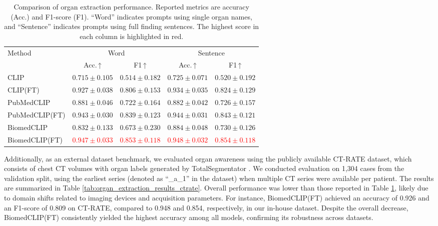\documentclass[bioengineering,article,submit,pdftex,moreauthors]{Definitions/mdpi}
\begin{document}
\begin{table}[ht]
  \centering
  \caption{Comparison of organ extraction performance. Reported metrics are accuracy (Acc.) and F1-score (F1). 
  “Word” indicates prompts using single organ names, and “Sentence” indicates prompts using full finding sentences. 
  The highest score in each column is highlighted in red.}
  \label{tab:organ_extraction_results}
  \begin{tabular}{lcccc}
    \toprule
    \multirow{2}{*}{Method} & \multicolumn{2}{c}{Word}               & \multicolumn{2}{c}{Sentence}           \\
    \cmidrule(lr){2-3}\cmidrule(lr){4-5}
                           & Acc.\,↑ & F1\,↑         & Acc.\,↑   & F1\,↑         \\ 
    \midrule
    CLIP                    & $0.715\pm0.105$ & $0.514\pm0.182$ & $0.725\pm0.071$ & $0.520\pm0.192$ \\
    CLIP(FT)                & $0.927\pm0.038$ & $0.806\pm0.153$ & $0.934\pm0.035$ & $0.824\pm0.129$ \\
    PubMedCLIP              & $0.881\pm0.046$ & $0.722\pm0.164$ & $0.882\pm0.042$ & $0.726\pm0.157$ \\
    PubMedCLIP(FT)          & $0.943\pm0.030$ & $0.839\pm0.123$ & $0.944\pm0.031$ & $0.843\pm0.121$ \\
    BiomedCLIP              & $0.832\pm0.133$ & $0.673\pm0.230$ & $0.884\pm0.048$ & $0.730\pm0.126$ \\
    BiomedCLIP(FT)          & \textcolor{red}{$0.947\pm0.033$} & \textcolor{red}{$0.853\pm0.118$} & \textcolor{red}{$0.948\pm0.032$} & \textcolor{red}{$0.854\pm0.118$} \\
    \bottomrule
  \end{tabular}
\end{table}


Additionally, as an external dataset benchmark, we evaluated organ awareness using the publicly available CT-RATE dataset, which consists of chest CT volumes with organ labels generated by TotalSegmentator \cite{hamamci_ct2rep_2024}. 
We conducted evaluation on 1,304 cases from the validation split, using the earliest series (denoted as “\_a\_1” in the dataset) when multiple CT series were available per patient. 
The results are summarized in Table \ref{tab:organ_extraction_results_ctrate}. 
Overall performance was lower than those reported in Table \ref{tab:organ_extraction_results}, likely due to domain shifts related to imaging devices and acquisition parameters. 
For instance, BiomedCLIP(FT) achieved an accuracy of 0.926 and an F1-score of 0.809 on CT-RATE, compared to 0.948 and 0.854, respectively, in our in-house dataset. 
Despite the overall decrease, BiomedCLIP(FT) consistently yielded the highest accuracy among all models, confirming its robustness across datasets.
\end{document}
